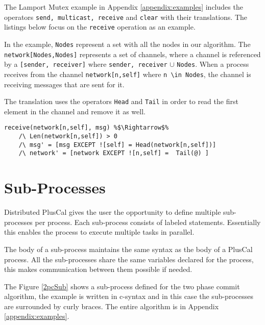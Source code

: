The Lamport Mutex example in Appendix \ref{appendix:examples} includes the operators \verb|send, multicast, receive| and \verb|clear| with their \tlaplus translations. The listings below focus on the \verb|receive| operation as an example.\newline


In the example, \verb|Nodes| represent a set with all the nodes in our algorithm. The \verb|network[Nodes,Nodes]| represents a set of channels, where a channel is referenced by a \verb|[sender, receiver]| where \verb|sender, receiver| $\cup$ \verb|Nodes|. When a process receives from the channel \verb|network[n,self]| where \verb|n \in Nodes|, the channel is receiving messages that are sent for it.

The \tlaplus translation uses the operators \verb|Head| and \verb|Tail| in order to read the first element in the channel and remove it as well.

\begin{lstlisting}[frame = none, numbers = none, escapechar=\%]
receive(network[n,self], msg) %$\Rightarrow$%
    /\ Len(network[n,self]) > 0 
    /\ msg' = [msg EXCEPT ![self] = Head(network[n,self])]
    /\ network' = [network EXCEPT ![n,self] =  Tail(@) ]
\end{lstlisting}

\section{Sub-Processes}
\label{subProcess}

Distributed PlusCal gives the user the opportunity to define multiple sub-processes per process. Each sub-process consists of labeled statements. Essentially this enables the process to execute multiple tasks in parallel.

The body of a sub-process maintains the same syntax as the body of a PlusCal process. All the sub-processes share the same variables declared for the process, this makes communication between them possible if needed.

The Figure \ref{2pcSub} shows a sub-process defined for the two phase commit algorithm, the example is written in c-syntax and in this case the sub-processes are surrounded by curly braces.
The entire algorithm is in Appendix \ref{appendix:examples}.

